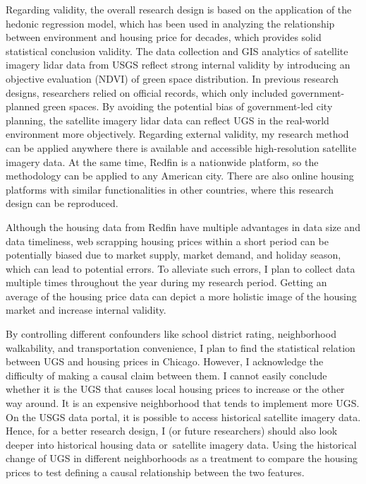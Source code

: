 Regarding validity, the overall research design is based on the application of the hedonic regression model, which has been used in analyzing the relationship between environment and housing price for decades, which provides solid statistical conclusion validity. The data collection and GIS analytics of satellite imagery lidar data from USGS reflect strong internal validity by introducing an objective evaluation (NDVI) of green space distribution. In previous research designs, researchers relied on official records, which only included government-planned green spaces. By avoiding the potential bias of government-led city planning, the satellite imagery lidar data can reflect UGS in the real-world environment more objectively. Regarding external validity, my research method can be applied anywhere there is available and accessible high-resolution satellite imagery data. At the same time, Redfin is a nationwide platform, so the methodology can be applied to any American city. There are also online housing platforms with similar functionalities in other countries, where this research design can be reproduced.

Although the housing data from Redfin have multiple advantages in data size and data timeliness, web scrapping housing prices within a short period can be potentially biased due to market supply, market demand, and holiday season, which can lead to potential errors. To alleviate such errors, I plan to collect data multiple times throughout the year during my research period. Getting an average of the housing price data can depict a more holistic image of the housing market and increase internal validity.

By controlling different confounders like school district rating, neighborhood walkability, and transportation convenience, I plan to find the statistical relation between UGS and housing prices in Chicago. However, I acknowledge the difficulty of making a causal claim between them. I cannot easily conclude whether it is the UGS that causes local housing prices to increase or the other way around. It is an expensive neighborhood that tends to implement more UGS. On the USGS data portal, it is possible to access historical satellite imagery data. Hence, for a better research design, I (or future researchers) should also look deeper into historical housing data or satellite imagery data. Using the historical change of UGS in different neighborhoods as a treatment to compare the housing prices to test defining a causal relationship between the two features.